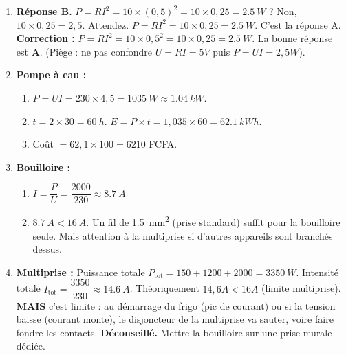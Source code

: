 \documentclass[11pt]{article}
\begin{document}
\begin{corrige}
\begin{enumerate}
\item \textbf{Réponse B.} $P = R I^2 = 10 \times (0,5)^2 = 10 \times 0,25 = \SI{2,5}{W}$ ? Non, $10 \times 0,25 = 2,5$. Attendez. $P = R I^2 = 10 \times 0,25 = \SI{2,5}{W}$. C'est la réponse A.
\textbf{Correction :} $P = R I^2 = 10 \times 0,5^2 = 10 \times 0,25 = \SI{2,5}{W}$. La bonne réponse est \textbf{A}. (Piège : ne pas confondre $U=RI=5V$ puis $P=UI=2,5W$).
\item \textbf{Pompe à eau :}
\begin{enumerate}
\item $P = U I = 230 \times 4,5 = \SI{1035}{W} \approx \SI{1,04}{kW}$.
\item $t = 2 \times 30 = \SI{60}{h}$. $E = P \times t = 1,035 \times 60 = \SI{62,1}{kWh}$.
\item Coût $= 62,1 \times 100 = \num{6210}$ FCFA.
\end{enumerate}
\item \textbf{Bouilloire :}
\begin{enumerate}
\item $I = \dfrac{P}{U} = \dfrac{2000}{230} \approx \SI{8,7}{A}$.
\item $\SI{8,7}{A} < \SI{16}{A}$. Un fil de \SI{1,5}{mm^2} (prise standard) suffit pour la bouilloire seule. Mais attention à la multiprise si d'autres appareils sont branchés dessus.
\end{enumerate}
\item \textbf{Multiprise :}
Puissance totale $P_{\text{tot}} = 150 + 1200 + 2000 = \SI{3350}{W}$.
Intensité totale $I_{\text{tot}} = \dfrac{3350}{230} \approx \SI{14,6}{A}$.
Théoriquement $14,6 A < 16 A$ (limite multiprise). \textbf{MAIS} c'est limite : au démarrage du frigo (pic de courant) ou si la tension baisse (courant monte), le disjoncteur de la multiprise va sauter, voire faire fondre les contacts. \textbf{Déconseillé.} Mettre la bouilloire sur une prise murale dédiée.
\end{enumerate}
\end{corrige}
\end{document}
